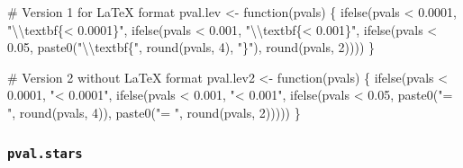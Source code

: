\documentclass[
  bookmarksnumbered]{article}
\newenvironment{Shaded}{\begin{snugshade}}{\end{snugshade}}
\newcommand{\CommentTok}[1]{\textcolor[rgb]{0.50,0.62,0.50}{#1}}
\newcommand{\ControlFlowTok}[1]{\textcolor[rgb]{0.94,0.87,0.69}{#1}}
\newcommand{\DecValTok}[1]{\textcolor[rgb]{0.86,0.86,0.80}{#1}}
\newcommand{\FloatTok}[1]{\textcolor[rgb]{0.75,0.75,0.82}{#1}}
\newcommand{\FunctionTok}[1]{\textcolor[rgb]{0.94,0.94,0.56}{#1}}
\newcommand{\NormalTok}[1]{\textcolor[rgb]{0.80,0.80,0.80}{#1}}
\newcommand{\OtherTok}[1]{\textcolor[rgb]{0.94,0.94,0.56}{#1}}
\newcommand{\SpecialCharTok}[1]{\textcolor[rgb]{0.86,0.64,0.64}{#1}}
\newcommand{\StringTok}[1]{\textcolor[rgb]{0.80,0.58,0.58}{#1}}
\begin{document}
\begin{Shaded}
\begin{Highlighting}[]
\CommentTok{\# Version 1 for LaTeX format}
\NormalTok{pval.lev }\OtherTok{\textless{}{-}} \ControlFlowTok{function}\NormalTok{(pvals) \{}
  \FunctionTok{ifelse}\NormalTok{(pvals }\SpecialCharTok{\textless{}} \FloatTok{0.0001}\NormalTok{,}
         \StringTok{"}\SpecialCharTok{\textbackslash{}\textbackslash{}}\StringTok{textbf\{\textless{} 0.0001\}"}\NormalTok{,}
         \FunctionTok{ifelse}\NormalTok{(pvals }\SpecialCharTok{\textless{}} \FloatTok{0.001}\NormalTok{,}
                \StringTok{"}\SpecialCharTok{\textbackslash{}\textbackslash{}}\StringTok{textbf\{\textless{} 0.001\}"}\NormalTok{,}
                \FunctionTok{ifelse}\NormalTok{(pvals }\SpecialCharTok{\textless{}} \FloatTok{0.05}\NormalTok{,}
                       \FunctionTok{paste0}\NormalTok{(}\StringTok{"}\SpecialCharTok{\textbackslash{}\textbackslash{}}\StringTok{textbf\{"}\NormalTok{, }\FunctionTok{round}\NormalTok{(pvals, }\DecValTok{4}\NormalTok{), }\StringTok{"\}"}\NormalTok{),}
                       \FunctionTok{round}\NormalTok{(pvals, }\DecValTok{2}\NormalTok{))))}
\NormalTok{\}}


\CommentTok{\# Version 2 without LaTeX format}
\NormalTok{pval.lev2 }\OtherTok{\textless{}{-}} \ControlFlowTok{function}\NormalTok{(pvals) \{}
  \FunctionTok{ifelse}\NormalTok{(pvals }\SpecialCharTok{\textless{}} \FloatTok{0.0001}\NormalTok{,}
         \StringTok{"\textless{} 0.0001"}\NormalTok{,}
         \FunctionTok{ifelse}\NormalTok{(pvals }\SpecialCharTok{\textless{}} \FloatTok{0.001}\NormalTok{,}
                \StringTok{"\textless{} 0.001"}\NormalTok{,}
                \FunctionTok{ifelse}\NormalTok{(pvals }\SpecialCharTok{\textless{}} \FloatTok{0.05}\NormalTok{,}
                       \FunctionTok{paste0}\NormalTok{(}\StringTok{"= "}\NormalTok{, }\FunctionTok{round}\NormalTok{(pvals, }\DecValTok{4}\NormalTok{)),}
                       \FunctionTok{paste0}\NormalTok{(}\StringTok{"= "}\NormalTok{, }\FunctionTok{round}\NormalTok{(pvals, }\DecValTok{2}\NormalTok{)))))}
\NormalTok{\}}
\end{Highlighting}
\end{Shaded}

\hypertarget{pval.stars}{%
\subsubsection{\texorpdfstring{\texttt{pval.stars}}{pval.stars}}\label{pval.stars}}
\end{document}
